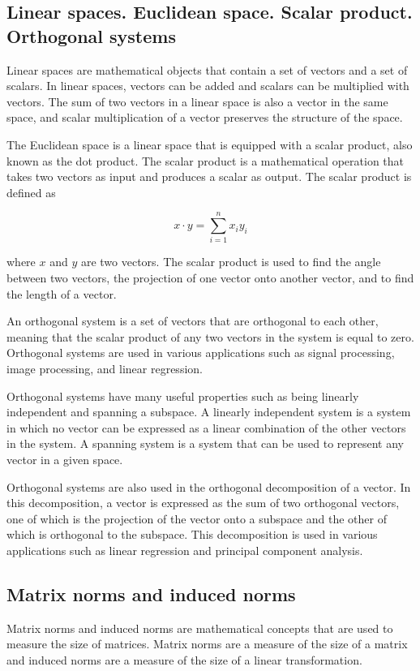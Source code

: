 \documentclass[12pt, a4paper, oneside]{article}
\begin{document}
\subsection{ Linear spaces. Euclidean space. Scalar product. Orthogonal systems }
Linear spaces are mathematical objects that contain a set of vectors and a set of scalars. In linear spaces, vectors can be added and scalars can be multiplied with vectors. The sum of two vectors in a linear space is also a vector in the same space, and scalar multiplication of a vector preserves the structure of the space.

The Euclidean space is a linear space that is equipped with a scalar product, also known as the dot product. The scalar product is a mathematical operation that takes two vectors as input and produces a scalar as output. The scalar product is defined as

$$x\cdot y = \sum\limits_{i=1}^{n} x_i y_i$$

where $x$ and $y$ are two vectors. The scalar product is used to find the angle between two vectors, the projection of one vector onto another vector, and to find the length of a vector.

An orthogonal system is a set of vectors that are orthogonal to each other, meaning that the scalar product of any two vectors in the system is equal to zero. Orthogonal systems are used in various applications such as signal processing, image processing, and linear regression.

Orthogonal systems have many useful properties such as being linearly independent and spanning a subspace. A linearly independent system is a system in which no vector can be expressed as a linear combination of the other vectors in the system. A spanning system is a system that can be used to represent any vector in a given space.

Orthogonal systems are also used in the orthogonal decomposition of a vector. In this decomposition, a vector is expressed as the sum of two orthogonal vectors, one of which is the projection of the vector onto a subspace and the other of which is orthogonal to the subspace. This decomposition is used in various applications such as linear regression and principal component analysis.

\subsection{ Matrix norms and induced norms }
Matrix norms and induced norms are mathematical concepts that are used to measure the size of matrices. Matrix norms are a measure of the size of a matrix and induced norms are a measure of the size of a linear transformation.
\end{document}
